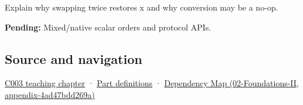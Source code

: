 Explain why swapping twice restores x and why conversion may be a no-op.

\textbf{Pending:} Mixed/native scalar orders and protocol APIs.

\subsection{Source and navigation}\label{appendix-11ba36693aa2-source-and-navigation}

\hyperref[01-foundations-i-ch002-where-the-bytes-live]{C003 teaching chapter} · \hyperref[appendix-fd090d982a15-m003---parts-41-60]{Part definitions} · \href{../02-Foundations-II/main.pdf\#nameddest=appendix-4ad47bdd269a}{Dependency Map (02-Foundations-II, appendix-4ad47bdd269a)}
